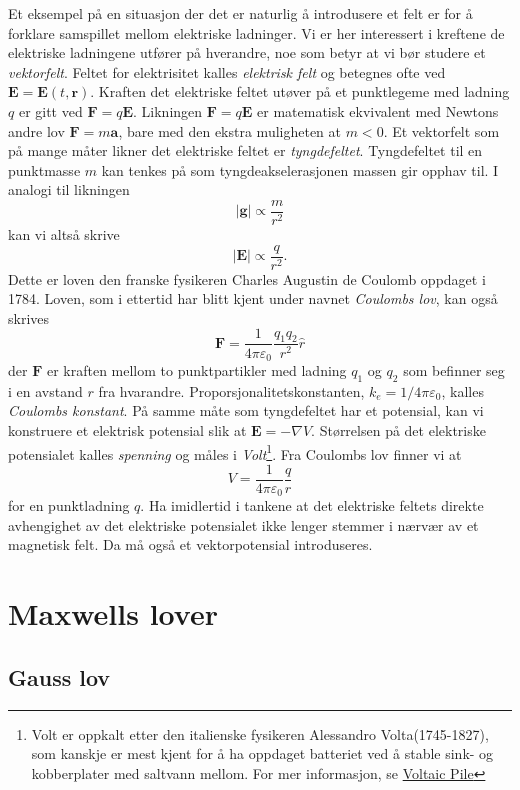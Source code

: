 \documentclass[twoside,utf8]{article}
\begin{document}
Et eksempel på en situasjon der det er naturlig å introdusere et felt er for å forklare samspillet mellom elektriske ladninger. Vi er her interessert i kreftene de elektriske ladningene utfører på hverandre, noe som betyr at vi bør studere et {\it vektorfelt}. Feltet for elektrisitet kalles {\it elektrisk felt} og betegnes ofte ved
$\mathbf{E}=\mathbf{E}(t,\mathbf{r})$. Kraften det elektriske feltet utøver på et punktlegeme med ladning $q$  er gitt ved $\mathbf{F}=q\mathbf{E}$.
Likningen $\mathbf{F}=q\mathbf{E}$ er matematisk ekvivalent med Newtons andre lov $\mathbf{F}=m\mathbf{a}$, bare med den ekstra muligheten at $m < 0$. Et vektorfelt som på mange måter likner det elektriske feltet er {\it tyngdefeltet}. Tyngdefeltet til en punktmasse $m$ kan tenkes på som tyngdeakselerasjonen massen gir opphav til. I analogi til likningen
$$
|\mathbf{g}| \propto \frac{m}{r^2}
$$
kan vi altså skrive
$$
|\mathbf{E}| \propto \frac{q}{r^2}.
$$
Dette er loven den franske fysikeren Charles Augustin de Coulomb oppdaget i 1784. Loven, som i ettertid har blitt kjent under navnet {\it Coulombs lov}, kan også skrives
$$
\mathbf{F} = \frac{1}{4 \pi \varepsilon_0 } \frac{q_1 q_2}{r^2}\hat{r}
$$
der $\mathbf{F}$ er kraften mellom to punktpartikler med ladning  $q_1$ og $q_2$ som befinner seg i en avstand $r$ fra hvarandre. Proporsjonalitetskonstanten, $k_e=1/4 \pi \varepsilon_0$, kalles {\it Coulombs konstant}. På samme måte som tyngdefeltet har et potensial, kan vi konstruere et elektrisk potensial slik at $\mathbf{E}=-\nabla V$. Størrelsen på det elektriske potensialet kalles {\it spenning} og måles i {\it Volt}\footnote{Volt er oppkalt etter den italienske fysikeren Alessandro Volta(1745-1827), som kanskje er mest kjent for å ha oppdaget batteriet ved å stable sink- og kobberplater med saltvann mellom. For mer informasjon, se \href{https://en.wikipedia.org/wiki/Voltaic_pile}{Voltaic Pile}}. Fra Coulombs lov finner vi at
$$
V = \frac{1}{4\pi \varepsilon_0} \frac{q}{r}
$$
for en punktladning $q$. Ha imidlertid i tankene at det elektriske feltets direkte avhengighet av det elektriske potensialet ikke lenger stemmer i nærvær av et magnetisk felt. Da må også et vektorpotensial introduseres.



\section{Maxwells lover}
\subsection{Gauss lov}
\end{document}
